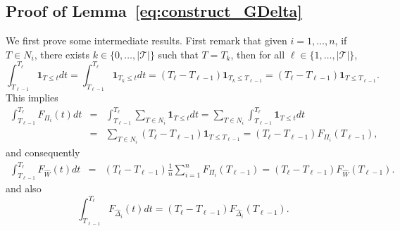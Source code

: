 \documentclass[aos]{imsart}
\theoremstyle{plain}
\theoremstyle{remark}
\newcommand{\1}{1}
\begin{document}
\subsection{Proof of Lemma~\ref{eq:construct_GDelta}}
We first prove some intermediate results. First remark that given $i=1,\hdots, n$, if $T\in N_i$, there exists $k\in\{0,\hdots,|\mathcal T|\}$ such that $T=T_k$, then for all $\ell\in \{1,\hdots,|\mathcal T|\}$, 
 \[
\int_{T_{\ell-1}}^{T_{\ell}}\mathbf 1_{T\leq t}dt=\int_{T_{\ell-1}}^{T_{\ell}}\mathbf 1_{T_{k}\leq t}dt=(T_{\ell}-T_{\ell-1})\mathbf 1_{T_k\leq T_{\ell-1}}=(T_{\ell}-T_{\ell-1})\mathbf 1_{T\leq T_{\ell-1}}. \]
This implies
\begin{eqnarray*}
\int_{T_{\ell-1}}^{T_\ell}F_{\Pi_i}(t)dt& =& \int_{T_{\ell-1}}^{T_\ell}\sum_{T\in N_i}\mathbf 1_{T\leq t}dt=\sum_{T\in N_i}\int_{T_{\ell-1}}^{T_\ell}\mathbf 1_{T\leq t}dt\\
&=&\sum_{T\in N_i}(T_\ell-T_{\ell-1})\mathbf 1_{T\leq T_{\ell-1}}=(T_\ell-T_{\ell-1})F_{\Pi_i}(T_{\ell-1}),
\end{eqnarray*}
and consequently
\begin{eqnarray*}
\int_{T_{\ell-1}}^{T_\ell}F_{\widehat W}(t)dt&=&(T_\ell-T_{\ell-1})\frac1n\sum_{i=1}^nF_{\Pi_i}(T_{\ell-1})  = (T_\ell-T_{\ell-1})F_{\widehat W}(T_{\ell-1}).  
\end{eqnarray*}
and also
\begin{equation}\label{intF}
\int_{T_{\ell-1}}^{T_\ell}F_{\widehat\Delta_i}(t)dt = (T_\ell-T_{\ell-1})F_{\widehat\Delta_i}(T_{\ell-1}).  
\end{equation}
\end{document}
